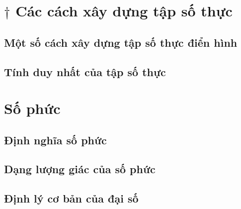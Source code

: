 \section{$\dagger$ Các cách xây dựng tập số thực}

\subsection*{Một số cách xây dựng tập số thực điển hình}

\subsection*{Tính duy nhất của tập số thực}

\section{Số phức}

\subsection*{Định nghĩa số phức}

\subsection*{Dạng lượng giác của số phức}

\subsection*{Định lý cơ bản của đại số}
